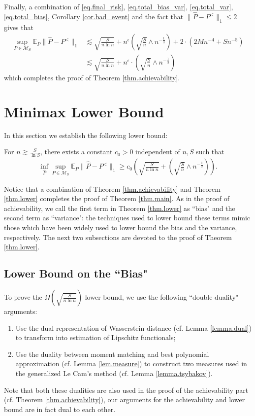 \documentclass[final,12pt]{colt2018} %
\def \bE {\mathbb{E}}
\newcommand{\calM}{{\mathcal{M}}}
\begin{document}
Finally, a combination of \eqref{eq.final_risk}, \eqref{eq.total_bias_var}, \eqref{eq.total_var}, \eqref{eq.total_bias}, Corollary \ref{cor.bad_event} and the fact that $\|\hat{P}-P^<\|_1\le 2$  gives that
\begin{align*}
\sup_{P\in \calM_S} \bE_P \|\hat{P}-P^<\|_1 &\lesssim \sqrt{\frac{S}{n\ln n}} + n^{\epsilon}\left(\sqrt{\frac{S}{n}}\wedge n^{-\frac{1}{3}}\right)  + 2\cdot(2Mn^{-4}+Sn^{-5}) \\
&\lesssim \sqrt{\frac{S}{n\ln n}} + n^{\epsilon}\cdot \left(\sqrt{\frac{S}{n}}\wedge n^{-\frac{1}{3}}\right)
\end{align*}
which completes the proof of Theorem \ref{thm.achievability}.

\section{Minimax Lower Bound}\label{sec.lower}
In this section we establish the following lower bound:
\begin{theorem}\label{thm.lower}
	For $n\gtrsim \frac{S}{\ln S}$, there exists a constant $c_0>0$ independent of $n,S$ such that
	\begin{align*}
	\inf_{\hat{P}}\sup_{P\in\calM_S} \bE_P\|\hat{P}-P^<\|_1 \ge c_0\left(\sqrt{\frac{S}{n\ln n}} + \left(\sqrt{\frac{S}{n}}\wedge n^{-\frac{1}{3}}\right)\right).
	\end{align*}
\end{theorem}

Notice that a combination of Theorem \ref{thm.achievability} and Theorem \ref{thm.lower} completes the proof of Theorem \ref{thm.main}. As in the proof of achievability, we call the first term in Theorem \ref{thm.lower} as ``bias" and the second term as ``variance": the techniques used to lower bound these terms mimic those which have been widely used to lower bound the bias and the variance, respectively. The next two subsections are devoted to the proof of Theorem \ref{thm.lower}.

\subsection{Lower Bound on the ``Bias"}
To prove the $\Omega(\sqrt{\frac{S}{n\ln n}})$ lower bound, we use the following ``double duality" arguments:
\begin{enumerate}
	\item Use the dual representation of Wasserstein distance (cf. Lemma \ref{lemma.dual}) to transform into estimation of Lipschitz functionals;
	\item Use the duality between moment matching and best polynomial approximation (cf. Lemma \ref{lem.measure}) to construct two measures used in the generalized Le Cam's method (cf. Lemma \ref{lemma.tsybakov}).
\end{enumerate}
Note that both these dualities are also used in the proof of the achievability part (cf. Theorem \ref{thm.achievability}), our arguments for the achievability and lower bound are in fact dual to each other.
\end{document}
